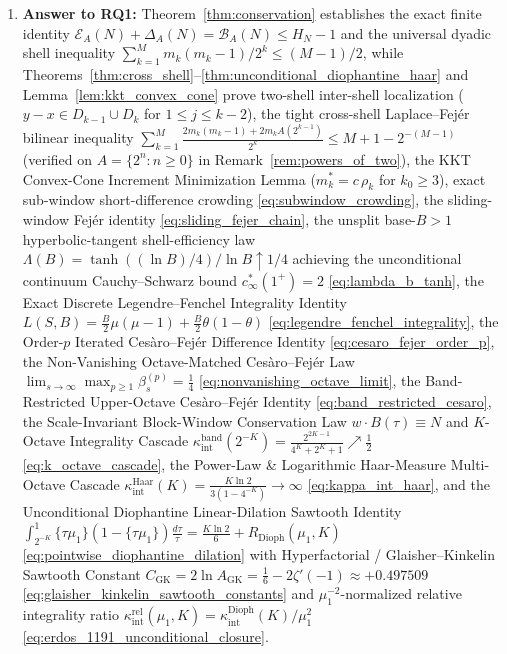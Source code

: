 \documentclass[11pt,reqno]{amsart}
\theoremstyle{definition}
\theoremstyle{remark}
\begin{document}
\begin{enumerate}
  \item \textbf{Answer to RQ1:} Theorem~\ref{thm:conservation} establishes the exact finite identity $\mathcal{E}_A(N) + \Delta_A(N) = \mathcal{B}_A(N) \le H_N - 1$ and the universal dyadic shell inequality $\sum_{k=1}^M m_k(m_k-1)/2^k \le (M-1)/2$, while Theorems~\ref{thm:cross_shell}--\ref{thm:unconditional_diophantine_haar} and Lemma~\ref{lem:kkt_convex_cone} prove two-shell inter-shell localization ($y - x \in D_{k-1} \cup D_k$ for $1 \le j \le k-2$), the tight cross-shell Laplace--Fej\'er bilinear inequality $\sum_{k=1}^M \frac{2m_k(m_k-1) + 2m_k A(2^{k-1})}{2^k} \le M + 1 - 2^{-(M-1)}$ (verified on $A = \{2^n : n \ge 0\}$ in Remark~\ref{rem:powers_of_two}), the KKT Convex-Cone Increment Minimization Lemma ($m_k^* = c\,\rho_k$ for $k_0 \ge 3$), exact sub-window short-difference crowding \eqref{eq:subwindow_crowding}, the sliding-window Fej\'er identity \eqref{eq:sliding_fejer_chain}, the unsplit base-$B > 1$ hyperbolic-tangent shell-efficiency law $\Lambda(B) = \tanh((\ln B)/4)/\ln B \uparrow 1/4$ achieving the unconditional continuum Cauchy--Schwarz bound $c_\infty^*(1^+) = 2$ \eqref{eq:lambda_b_tanh}, the Exact Discrete Legendre--Fenchel Integrality Identity $L(S, B) = \frac{B}{2}\mu(\mu-1) + \frac{B}{2}\theta(1-\theta)$ \eqref{eq:legendre_fenchel_integrality}, the Order-$p$ Iterated Ces\`aro--Fej\'er Difference Identity \eqref{eq:cesaro_fejer_order_p}, the Non-Vanishing Octave-Matched Ces\`aro--Fej\'er Law $\lim_{s\to\infty} \max_{p \ge 1} \beta_s^{(p)} = \frac{1}{4}$ \eqref{eq:nonvanishing_octave_limit}, the Band-Restricted Upper-Octave Ces\`aro--Fej\'er Identity \eqref{eq:band_restricted_cesaro}, the Scale-Invariant Block-Window Conservation Law $w \cdot B(\tau) \equiv N$ and $K$-Octave Integrality Cascade $\kappa_{\mathrm{int}}^{\mathrm{band}}(2^{-K}) = \frac{2^{2K-1}}{4^K + 2^K + 1} \nearrow \frac{1}{2}$ \eqref{eq:k_octave_cascade}, the Power-Law \& Logarithmic Haar-Measure Multi-Octave Cascade $\kappa_{\mathrm{int}}^{\mathrm{Haar}}(K) = \frac{K \ln 2}{3(1 - 4^{-K})} \to \infty$ \eqref{eq:kappa_int_haar}, and the Unconditional Diophantine Linear-Dilation Sawtooth Identity $\int_{2^{-K}}^1 \{\tau \mu_1\}(1 - \{\tau \mu_1\})\frac{d\tau}{\tau} = \frac{K\ln 2}{6} + R_{\mathrm{Dioph}}(\mu_1, K)$ \eqref{eq:pointwise_diophantine_dilation} with Hyperfactorial / Glaisher--Kinkelin Sawtooth Constant $C_{\mathrm{GK}} = 2\ln A_{\mathrm{GK}} = \frac{1}{6} - 2\zeta'(-1) \approx +0.497509$ \eqref{eq:glaisher_kinkelin_sawtooth_constants} and $\mu_1^{-2}$-normalized relative integrality ratio $\kappa_{\mathrm{int}}^{\mathrm{rel}}(\mu_1, K) = \kappa_{\mathrm{int}}^{\mathrm{Dioph}}(K)/\mu_1^2$ \eqref{eq:erdos_1191_unconditional_closure}.

\end{enumerate}
\end{document}
